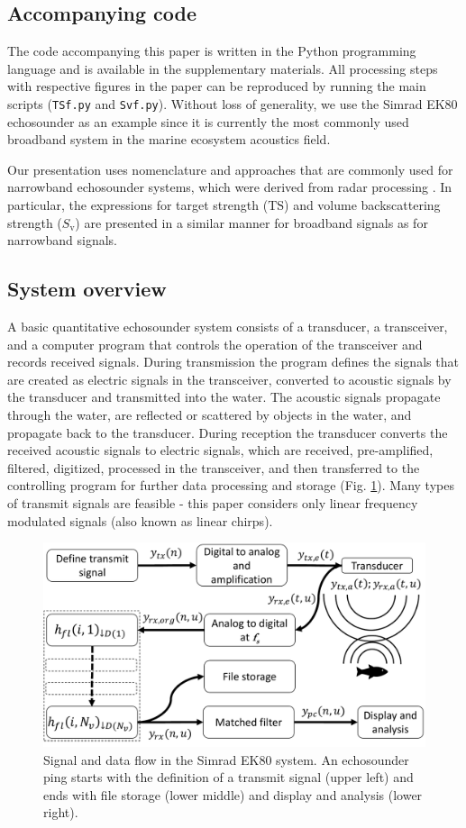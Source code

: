 \documentclass[preprint,12pt,TurnOnLineNumbers]{JASAnew}
\newcommand{\ek}{Simrad EK80}
\newcommand{\ts}{\textrm{TS}}
\newcommand{\sv}{S_{\textrm{v}}}
\newcommand{\code}[1]{\texttt{#1}}
\begin{document}
\subsection{Accompanying code}
The code accompanying this paper is written in the Python programming language and is available in the supplementary materials. All processing steps with respective figures in the paper can be reproduced by running the main scripts (\code{TSf.py} and \code{Svf.py}). Without loss of generality, we use the \ek{} echosounder as an example since it is currently the most commonly used broadband system in the marine ecosystem acoustics field. 

Our presentation uses nomenclature and approaches that are commonly used for narrowband echosounder systems, which were derived from radar processing \citep{cook1967}. In particular, the expressions for target strength ($\ts$) and volume backscattering strength ($\sv$) \citep{MacLennan2002consistent} are presented in a similar manner for broadband signals as for narrowband signals.

\subsection{System overview}
A basic quantitative echosounder system consists of a transducer, a transceiver, and a computer program that controls the operation of the transceiver and records received signals. During transmission the program defines the signals that are created as electric signals in the transceiver, converted to acoustic signals by the transducer and transmitted into the water. The acoustic signals propagate through the water, are reflected or scattered by objects in the water, and propagate back to the transducer. During reception the transducer converts the received acoustic signals to electric signals, which are received, pre-amplified, filtered, digitized, processed in the transceiver, and then transferred to the controlling program for further data processing and storage (Fig. \ref{fi:ek_sys}). Many types of transmit signals are feasible - this paper considers only linear frequency modulated signals (also known as linear chirps).

\begin{figure}
\includegraphics[width=16cm]{Fig_ek_sys}
\caption{\label{fi:ek_sys}Signal and data flow in the \ek{} system. An echosounder ping starts with the definition of a transmit signal (upper left) and ends with file storage (lower middle) and display and analysis (lower right).}
\end{figure}
\end{document}
